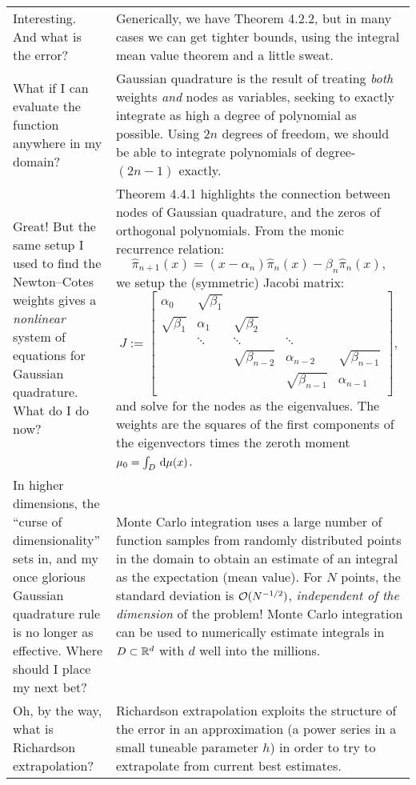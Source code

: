 \documentclass[11pt,letterpaper]{article}
\begin{document}
\begin{longtable}{p{}|p{}}
Interesting. And what is the error? & Generically, we have Theorem 4.2.2, but in many cases we can get tighter bounds, using the integral mean value theorem and a little sweat.\\

What if I can evaluate the function anywhere in my domain? & Gaussian quadrature is the result of treating {\em both} weights {\em and} nodes as variables, seeking to exactly integrate as high a degree of polynomial as possible. Using $2n$ degrees of freedom, we should be able to integrate polynomials of degree-$(2n-1)$ exactly.\\

Great! But the same setup I used to find the Newton--Cotes weights gives a {\em nonlinear} system of equations for Gaussian quadrature. What do I do now? & Theorem 4.4.1 highlights the connection between nodes of Gaussian quadrature, and the zeros of orthogonal polynomials. From the monic recurrence relation:
$$\hat{\pi}_{n+1}(x) = (x-\alpha_n)\hat{\pi}_n(x) - \beta_n\hat{\pi}_n(x),$$
we setup the (symmetric) Jacobi matrix:
$$J := \begin{bmatrix}
\alpha_0 & \sqrt{\beta_1}\\
\sqrt{\beta_1} & \alpha_1 & \sqrt{\beta_2}\\
& \ddots & \ddots & \ddots\\
& & \sqrt{\beta_{n-2}} & \alpha_{n-2} & \sqrt{\beta_{n-1}}\\
& & & \sqrt{\beta_{n-1}} & \alpha_{n-1}\\
\end{bmatrix},$$
and solve for the nodes as the eigenvalues. The weights are the squares of the first components of the eigenvectors times the zeroth moment $\mu_0 = \int_D{\rm\,d}\mu(x)$.\\

In higher dimensions, the ``curse of dimensionality'' sets in, and my once glorious Gaussian quadrature rule is no longer as effective. Where should I place my next bet? & Monte Carlo integration uses a large number of function samples from randomly distributed points in the domain to obtain an estimate of an integral as the expectation (mean value). For $N$ points, the standard deviation is $\mathcal{O}(N^{-1/2})$, {\em independent of the dimension} of the problem! Monte Carlo integration can be used to numerically estimate integrals in $D\subset\mathbb{R}^d$ with $d$ well into the millions.\\

Oh, by the way, what is Richardson extrapolation? & Richardson extrapolation exploits the structure of the error in an approximation (a power series in a small tuneable parameter $h$) in order to try to extrapolate from current best estimates.


\end{longtable}
\end{document}
